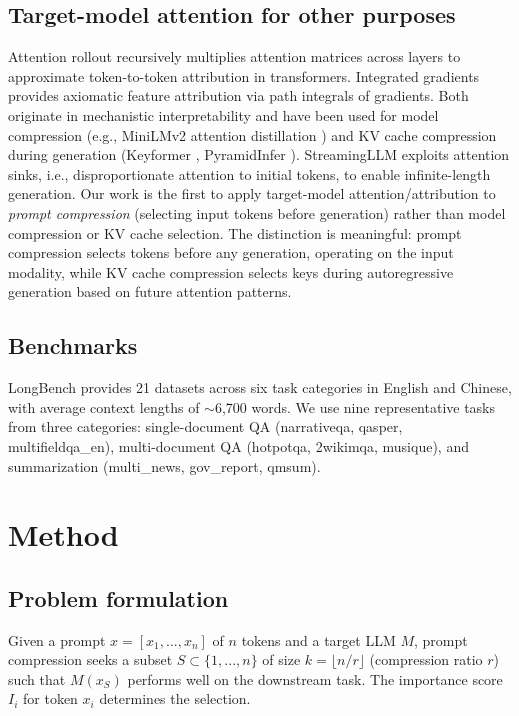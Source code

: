\documentclass[11pt,letterpaper]{article}
\begin{document}
\subsection{Target-model attention for other purposes}
Attention rollout \citep{Abnar2020} recursively multiplies attention matrices across layers to approximate token-to-token attribution in transformers. Integrated gradients \citep{Sundararajan2017} provides axiomatic feature attribution via path integrals of gradients. Both originate in mechanistic interpretability \citep{Vig2019, Chefer2021} and have been used for model compression (e.g., MiniLMv2 attention distillation \citep{Wang2021}) and KV cache compression during generation (Keyformer \citep{Liu2023}, PyramidInfer \citep{Zhang2023}). StreamingLLM \citep{Xiao2024} exploits attention sinks, i.e., disproportionate attention to initial tokens, to enable infinite-length generation. Our work is the first to apply target-model attention/attribution to \emph{prompt compression} (selecting input tokens before generation) rather than model compression or KV cache selection. The distinction is meaningful: prompt compression selects tokens before any generation, operating on the input modality, while KV cache compression selects keys during autoregressive generation based on future attention patterns.

\subsection{Benchmarks}
LongBench \citep{Bai2024} provides 21 datasets across six task categories in English and Chinese, with average context lengths of $\sim$6,700 words. We use nine representative tasks from three categories: single-document QA (narrativeqa, qasper, multifieldqa\_en), multi-document QA (hotpotqa, 2wikimqa, musique), and summarization (multi\_news, gov\_report, qmsum).

\section{Method}

\subsection{Problem formulation}
Given a prompt $x = [x_1, ..., x_n]$ of $n$ tokens and a target LLM $M$, prompt compression seeks a subset $S \subset \{1,...,n\}$ of size $k = \lfloor n/r \rfloor$ (compression ratio $r$) such that $M(x_S)$ performs well on the downstream task. The importance score $I_i$ for token $x_i$ determines the selection.
\end{document}

